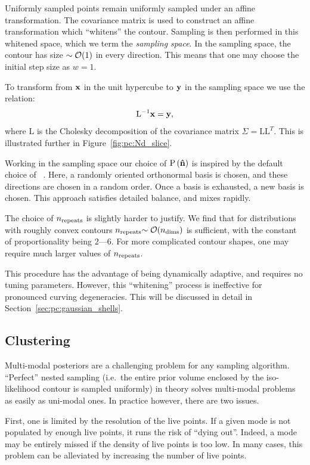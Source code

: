 Uniformly sampled points remain uniformly sampled under an affine transformation. The covariance matrix is used to construct an affine transformation which ``whitens'' the contour. Sampling is then performed in this whitened space, which we term the {\em sampling space}.
In the sampling space, the contour has size \({\sim\mathcal{O}{\left(1\right)}}\) in every direction. This means that one may choose the initial step size as \(w=1\).

To transform from \(\mathbf{x}\) in the unit hypercube to \(\mathbf{y}\) in the sampling space we use the relation:
\begin{equation}
  \mathrm{L}^{-1}\mathbf{x} =  \mathbf{y},
  \label{eqn:pc:cholesky}
\end{equation}
where \(\mathrm{L}\) is the Cholesky decomposition of the covariance matrix \(\Sigma = \mathrm{L} \mathrm{L}^{T}\).
This is illustrated further in Figure~\ref{fig:pc:Nd_slice}.

Working in the sampling space our choice of \(\mathrm{P}\left(\mathbf{\hat{n}}\right)\) is inspired by the default choice of \CosmoMC{}~\citep{LewisFastSlow}. Here, a randomly oriented orthonormal basis is chosen, and these directions are chosen in a random order. Once a basis is exhausted, a new basis is chosen. This approach satisfies detailed balance, and mixes rapidly.

The choice of \(n_{\mathrm{repeats}}\) is slightly harder to justify. We find that for distributions with roughly convex contours \(n_{\mathrm{repeats}}{\sim\mathcal{O}{\left(n_{\mathrm{dims}}\right)}}\) is sufficient, with the constant of proportionality being \(2\)---\(6\). For more complicated contour shapes, one may require much larger values of \(n_{\mathrm{repeats}}\). 

This procedure has the advantage of being dynamically adaptive, and requires no tuning parameters. However, this ``whitening'' process is ineffective for pronounced curving degeneracies. This will be discussed in detail in Section~\ref{sec:pc:gaussian_shells}.


\subsection{Clustering}
\label{sec:pc:clustering}
Multi-modal posteriors are a challenging problem for any sampling algorithm. ``Perfect'' nested sampling (i.e.\ the entire prior volume enclosed by the iso-likelihood contour is sampled uniformly) in theory solves multi-modal problems as easily as uni-modal ones. In practice however, there are two issues.

First, one is limited by the resolution of the live points. If a given mode is not populated by enough live points, it runs the risk of ``dying out''. Indeed, a mode may be entirely missed if the density of live points is too low. In many cases, this problem can be alleviated by increasing the number of live points.

